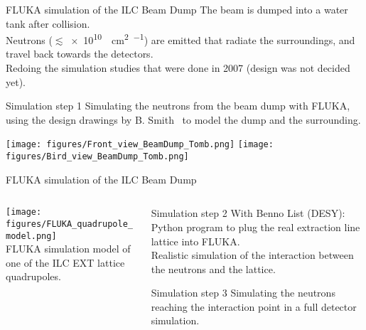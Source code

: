 {
\begin{frame}{FLUKA simulation of the ILC Beam Dump}
\flukalogo
The beam is dumped into a water tank after collision.\\Neutrons ($\lesssim$\SI{e10}{\per\square\centi\metre\per\year}) are emitted that radiate the surroundings, and travel back towards the detectors.\\
\vspace*{0.1cm}
Redoing the simulation studies that were done in 2007 (design was not decided yet).
\begin{block}{Simulation step 1}
Simulating the neutrons from the beam dump with FLUKA, using the design drawings by B. Smith~\cite{Smith} to model the dump and the surrounding.
\end{block}

\begin{center}
\texttt{[image: figures/Front\_view\_BeamDump\_Tomb.png]}
\hspace*{0.2cm}
\texttt{[image: figures/Bird\_view\_BeamDump\_Tomb.png]}
\end{center}
\end{frame}

\begin{frame}{FLUKA simulation of the ILC Beam Dump}
\flukalogo
\begin{columns}
\begin{column}[c]{0.4\textwidth}
\texttt{[image: figures/FLUKA\_quadrupole\_model.png]}\\
\small FLUKA simulation model of one of the ILC EXT lattice quadrupoles.
\end{column}
\begin{column}[c]{0.55\textwidth}
\begin{block}{Simulation step 2}
With Benno List (DESY): Python program to plug the real extraction line lattice into FLUKA.\\
Realistic simulation of the interaction between the neutrons and the lattice.
\end{block}
\begin{block}{Simulation step 3}
Simulating the neutrons reaching the interaction point in a full detector simulation.
\end{block}
\end{column}
\end{columns}
\end{frame}

}

